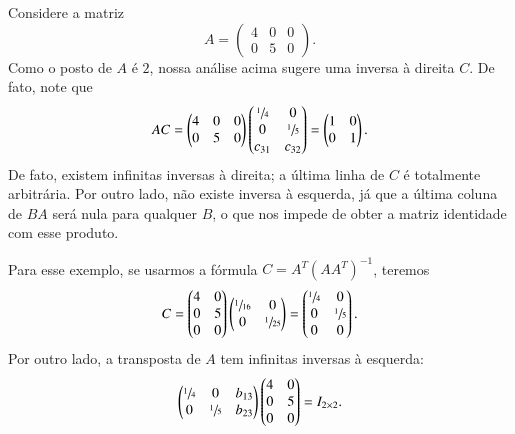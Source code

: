 \begin{exemplo}[Strang, p. 97]
  Considere a matriz
  \begin{equation*}
    A =
    \begin{pmatrix}
      4 & 0 & 0\\
      0 & 5 & 0
    \end{pmatrix}.
  \end{equation*}
  Como o posto de $A$ é $2$, nossa análise acima sugere uma inversa à direita $C$. De fato, note que
  \begin{equation*}
    AC =
    \begin{pmatrix}
      4 & 0 & 0\\
      0 & 5 & 0
    \end{pmatrix}
    \begin{pmatrix}
      \sfrac{1}{4} & 0\\
      0 & \sfrac{1}{5}\\
      c_{31} & c_{32}
    \end{pmatrix}
    =
    \begin{pmatrix}
      1 & 0\\
      0 & 1
    \end{pmatrix}.
  \end{equation*}
  De fato, existem infinitas inversas à direita; a última linha de $C$ é totalmente arbitrária. Por outro lado, não existe inversa à esquerda, já que a última coluna de $BA$ será nula para qualquer $B$, o que nos impede de obter a matriz identidade com esse produto.

  Para esse exemplo, se usarmos a fórmula $C=A^T(AA^T)^{-1}$, teremos
  \begin{equation*}
    C =
    \begin{pmatrix}
      4 & 0\\
      0 & 5\\
      0 & 0
    \end{pmatrix}
    \begin{pmatrix}
      \sfrac{1}{16} & 0\\
      0 & \sfrac{1}{25}
    \end{pmatrix}
    =
    \begin{pmatrix}
      \sfrac{1}{4} & 0\\
      0 & \sfrac{1}{5}\\
      0 & 0
    \end{pmatrix}.
  \end{equation*}
  Por outro lado, a transposta de $A$ tem infinitas inversas à esquerda:
  \begin{equation*}
    \begin{pmatrix}
      \sfrac{1}{4} & 0 & b_{13}\\
      0 & \sfrac{1}{5} & b_{23}
    \end{pmatrix}
    \begin{pmatrix}
      4 & 0\\
      0 & 5\\
      0 & 0
    \end{pmatrix}
    = I_{2\times 2}.
  \end{equation*}
\end{exemplo}

